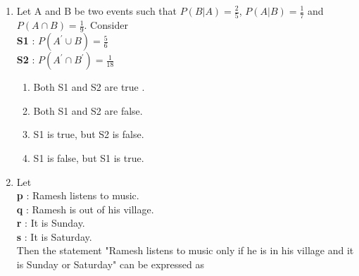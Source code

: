\documentclass[journal,12pt,onecolumn]{IEEEtran}
\theoremstyle{remark}
\begin{document}
\begin{enumerate}
		\begin{enumerate}
		\end{enumerate}
	\item Let A and B be two events such that $P(B|A) = \frac{2}{5}$, $P(A|B) = \frac{1}{7}$ and $P(A \cap B) = \frac{1}{9}$. Consider \\
		\textbf{S1} : $P(A^{\prime} \cup B) = \frac{5}{6} $ \\
		\textbf{S2} : $P(A^{\prime} \cap B^{\prime}) = \frac{1}{18} $ \\
		\begin{enumerate}
			\item Both S1 and S2 are true .
			\item Both S1 and S2 are false.
			\item S1 is true, but S2 is false.
			\item S1 is false, but S1 is true.
		\end{enumerate}
	\item Let \\
		\textbf{p} : Ramesh listens to music. \\
		\textbf{q} : Ramesh is out of his village. \\
		\textbf{r} : It is Sunday. \\
		\textbf{s} : It is Saturday. \\
		Then the statement "Ramesh listens to music only if he is in his village and it is Sunday or Saturday" can be expressed as 
		\begin{enumerate}
		\end{enumerate}
\end{enumerate}
\end{document}

